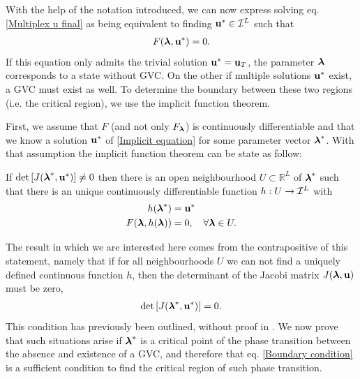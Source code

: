 \documentclass[
11pt, %
english, %
singlespacing, %
nolistspacing, %
liststotoc, %
headsepline, %
]{MastersDoctoralThesis} %
\begin{document}
With the help of the notation introduced, we can now express solving eq. \eqref{Multiplex u final} as being equivalent to finding $\boldsymbol{\mathrm{u}}^* \in \mathcal{I}^L$ such that
\begin{align}
	F(\boldsymbol{\mathrm{\lambda}}, \boldsymbol{\mathrm{u}}^*) = 0. \label{Implicit equation}
\end{align}
If this equation only admits the trivial solution $\boldsymbol{\mathrm{u}}^* = \boldsymbol{\mathrm{u}}_T$, the parameter $\boldsymbol{\mathrm{\lambda}}$ corresponds to a state without GVC. On the other if multiple solutions $\boldsymbol{\mathrm{u}}^*$ exist, a GVC must exist as well. To determine the boundary between these two regions (i.e. the critical region), we use the implicit function theorem.

First, we assume that $F$ (and not only $F_{\boldsymbol{\mathrm{\lambda}}}$) is continuously differentiable and that we know a solution $\boldsymbol{\mathrm{u}}^*$ of \eqref{Implicit equation} for some parameter vector $\boldsymbol{\mathrm{\lambda}}^*$. With that assumption the implicit function theorem can be state as follow:

If $\det\left[ J(\boldsymbol{\mathrm{\lambda}}^*, \boldsymbol{\mathrm{u}}^*) \right] \neq 0$ then there is an open neighbourhood $U \subset \mathbb{R}^L$ of $\boldsymbol{\mathrm{\lambda}}^*$ such that there is an unique continuously differentiable function $h : U \rightarrow \mathcal{I}^L$ with
\begin{align}
	h(\boldsymbol{\mathrm{\lambda}}^*) &= \boldsymbol{\mathrm{u}}^* \\
	F(\boldsymbol{\mathrm{\lambda}}, h(\boldsymbol{\mathrm{\lambda}})) &= 0, \quad \forall \boldsymbol{\mathrm{\lambda}} \in U. \label{Implicit solution for F}
\end{align}

The result in which we are interested here comes from the contrapositive of this statement, namely that if for all neighbourhoods $U$ we can not find a uniquely defined continuous function $h$, then the determinant of the Jacobi matrix $J(\boldsymbol{\mathrm{\lambda}}, \boldsymbol{\mathrm{u}})$ must be zero,
\begin{align}
	\det\left[ J(\boldsymbol{\mathrm{\lambda}}^*, \boldsymbol{\mathrm{u}}^*) \right] = 0 \label{Boundary condition}.
\end{align}
This condition has previously been outlined, without proof in \cite{baxter2012avalanche}. We now prove that such situations arise if $\boldsymbol{\mathrm{\lambda}}^*$ is a critical point of the phase transition between the absence and existence of a GVC, and therefore that eq. \eqref{Boundary condition} is a sufficient condition to find the critical region of such phase transition.
\end{document}
